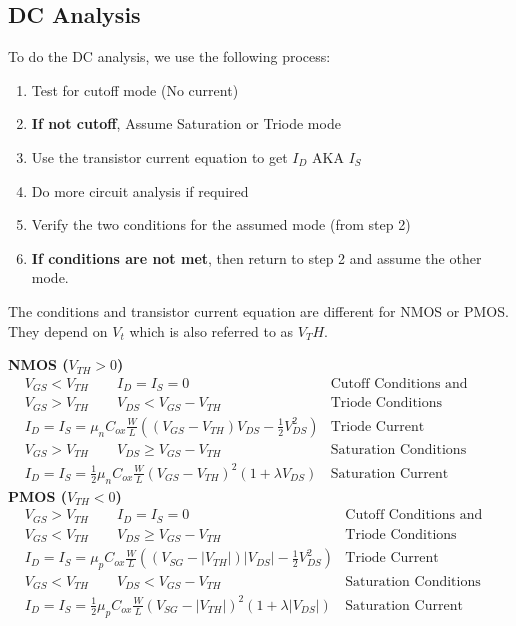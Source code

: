 \documentclass[12pt,letterpaper]{article} \usepackage{amsmath} \usepackage{graphicx} \usepackage[margin=1in]{geometry} \usepackage{longtable}  \usepackage{amssymb}
\begin{document}
	
	\subsection{DC Analysis}
	To do the DC analysis, we use the following process:
	\begin{enumerate}
		\item Test for cutoff mode (No current)
		\item \textbf{If not cutoff}, Assume Saturation or Triode mode
		\item Use the transistor current equation to get $I_D$ AKA $I_S$
		\item Do more circuit analysis if required
		\item Verify the two conditions for the assumed mode (from step 2)
		\item \textbf{If conditions are not met}, then return to step 2 and assume the other mode.
	\end{enumerate}

	The conditions and transistor current equation are different for NMOS or PMOS. They depend on $V_t$ which is also referred to as $V_TH$.
	
	\textbf{NMOS ($V_{TH}>0$)}
	\begin{align*}
		&V_{GS} < V_{TH} \qquad I_D = I_S = 0 &\text{Cutoff Conditions and Current}\\
		&V_{GS} > V_{TH} \qquad V_{DS} < V_{GS} - V_{TH} &\text{Triode Conditions}\\
		&I_D = I_S = \mu_n C_{ox} \frac{W}{L} \left((V_{GS}-V_{TH})V_{DS} - \frac{1}{2}V^2_{DS}\right)&\text{Triode Current}\\
		&V_{GS} > V_{TH} \qquad V_{DS} \ge V_{GS} - V_{TH}&\text{Saturation Conditions}\\
		&I_D = I_S = \frac{1}{2}\mu_n C_{ox} \frac{W}{L} (V_{GS} - V_{TH})^2(1+\lambda V_{DS})&\text{Saturation Current}
	\end{align*}
	\textbf{PMOS ($V_{TH}<0$)}
	\begin{align*}
		&V_{GS} > V_{TH} \qquad I_D = I_S = 0 &\text{Cutoff Conditions and Current}\\
		&V_{GS} < V_{TH} \qquad V_{DS} \ge V_{GS} - V_{TH} &\text{Triode Conditions}\\
		&I_D = I_S = \mu_p C_{ox} \frac{W}{L} \left((V_{SG}-|V_{TH}|)|V_{DS}| - \frac{1}{2}V^2_{DS}\right)&\text{Triode Current}\\
		&V_{GS} < V_{TH} \qquad V_{DS} < V_{GS} - V_{TH}&\text{Saturation Conditions}\\
		&I_D = I_S = \frac{1}{2}\mu_p C_{ox} \frac{W}{L} (V_{SG} - |V_{TH}|)^2(1+\lambda |V_{DS}|)&\text{Saturation Current}
	\end{align*}
	
\end{document}

